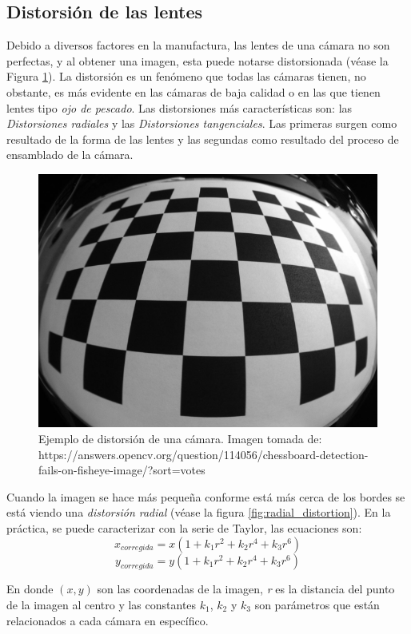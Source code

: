 		\subsection*{Distorsión de las lentes}
Debido a diversos factores en la manufactura, las lentes de una cámara no son perfectas, y al obtener una imagen, esta puede notarse distorsionada (véase la Figura \ref{fig:image_distorted}). La distorsión es un fenómeno que todas las cámaras tienen, no obstante, es más evidente en las cámaras de baja calidad o en las que tienen lentes tipo \textit{ojo de pescado}. Las distorsiones más características son: las \textit{Distorsiones radiales} y las \textit{Distorsiones tangenciales}. Las primeras surgen como resultado de la forma de las lentes y las segundas como resultado del proceso de ensamblado de la cámara.

\begin{figure}
\centering
\includegraphics[scale=0.5]{images/image_distorted.png}
\caption{Ejemplo de distorsión de una cámara. Imagen tomada de: https://answers.opencv.org/question/114056/chessboard-detection-fails-on-fisheye-image/?sort=votes}
\label{fig:image_distorted}
\end{figure}

Cuando la imagen se hace más pequeña conforme está más cerca de los bordes se está viendo una \textit{distorsión radial} (véase la figura \ref{fig:radial_distortion}). En la práctica, se puede caracterizar con la serie de Taylor, las ecuaciones son:
\[x_{corregida} = x(1+k_1r^2+k_2r^4+k_3r^6)\]
\[y_{corregida} = y(1+k_1r^2+k_2r^4+k_3r^6)\]

En donde $(x,y)$ son las coordenadas de la imagen, \textit{r} es la distancia del punto de la imagen al centro y las constantes $k_1$, $k_2$ y $k_3$ son parámetros que están relacionados a cada cámara en específico.

